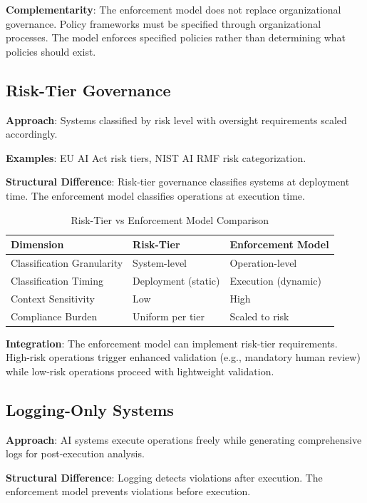 \documentclass[11pt,letterpaper]{article}
\begin{document}
\textbf{Complementarity}: The enforcement model does not replace organizational governance. Policy frameworks must be specified through organizational processes. The model enforces specified policies rather than determining what policies should exist.

\subsection{Risk-Tier Governance}

\textbf{Approach}: Systems classified by risk level with oversight requirements scaled accordingly.

\textbf{Examples}: EU AI Act risk tiers, NIST AI RMF risk categorization.

\textbf{Structural Difference}: Risk-tier governance classifies systems at deployment time. The enforcement model classifies operations at execution time.

\begin{table}[htbp]
\centering
\caption{Risk-Tier vs Enforcement Model Comparison}
\label{tab:risk_comparison}
\begin{tabular}{@{}lll@{}}
\toprule
\textbf{Dimension} & \textbf{Risk-Tier} & \textbf{Enforcement Model} \\
\midrule
Classification Granularity & System-level & Operation-level \\
Classification Timing & Deployment (static) & Execution (dynamic) \\
Context Sensitivity & Low & High \\
Compliance Burden & Uniform per tier & Scaled to risk \\
\bottomrule
\end{tabular}
\end{table}

\textbf{Integration}: The enforcement model can implement risk-tier requirements. High-risk operations trigger enhanced validation (e.g., mandatory human review) while low-risk operations proceed with lightweight validation.

\subsection{Logging-Only Systems}

\textbf{Approach}: AI systems execute operations freely while generating comprehensive logs for post-execution analysis.

\textbf{Structural Difference}: Logging detects violations after execution. The enforcement model prevents violations before execution.
\end{document}
